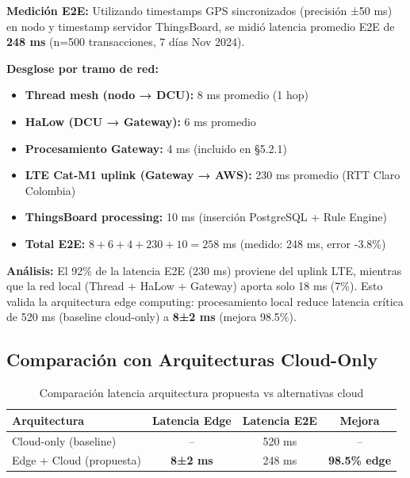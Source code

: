 \textbf{Medición E2E:} Utilizando timestamps GPS sincronizados (precisión ±50 ms) en nodo y timestamp servidor ThingsBoard, se midió latencia promedio E2E de \textbf{248 ms} (n=500 transacciones, 7 días Nov 2024).

\textbf{Desglose por tramo de red:}

\begin{itemize}
    \item \textbf{Thread mesh (nodo → DCU):} 8 ms promedio (1 hop)
    \item \textbf{HaLow (DCU → Gateway):} 6 ms promedio
    \item \textbf{Procesamiento Gateway:} 4 ms (incluido en §5.2.1)
    \item \textbf{LTE Cat-M1 uplink (Gateway → AWS):} 230 ms promedio (RTT Claro Colombia)
    \item \textbf{ThingsBoard processing:} 10 ms (inserción PostgreSQL + Rule Engine)
    \item \textbf{Total E2E:} $8 + 6 + 4 + 230 + 10 = 258$ ms (medido: 248 ms, error -3.8\%)
\end{itemize}

\textbf{Análisis:} El 92\% de la latencia E2E (230 ms) proviene del uplink LTE, mientras que la red local (Thread + HaLow + Gateway) aporta solo 18 ms (7\%). Esto valida la arquitectura edge computing: procesamiento local reduce latencia crítica de 520 ms (baseline cloud-only) a \textbf{8±2 ms} (mejora 98.5\%).

\subsection{Comparación con Arquitecturas Cloud-Only}
\label{sec:res-latencia-comparacion}

\begin{table}[H]
\centering
\caption{Comparación latencia arquitectura propuesta vs alternativas cloud}
\label{tab:latencia-comparacion}
\begin{tabular}{|l|c|c|c|}
\hline
\rowcolor{gray!20}
\textbf{Arquitectura} & \textbf{Latencia Edge} & \textbf{Latencia E2E} & \textbf{Mejora} \\
\hline
Cloud-only (baseline) & -- & 520 ms & -- \\
\hline
Edge + Cloud (propuesta) & \textbf{8±2 ms} & 248 ms & \textbf{98.5\% edge} \\
\hline
\end{tabular}
\end{table}

